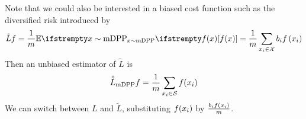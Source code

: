Note that we could also be interested in a biased cost function such as the diversified risk introduced by \cite{zhang2017dppminibatch}
$$
\tilde L{\query} =\frac{1}{m}\EE{x \sim \textrm{mDPP}}{\query(x)}=\frac{1}{m}\sum_{x_i \in \mathcal X} b_{i} \query\left(x_{i}\right)
$$
Then an unbiased estimator of $\tilde L$ is
\begin{equation*}
	\hat{\tilde L}_{\textrm{mDPP}}{f} = \frac{1}{m}\sum_{x_i\in \mathcal S} f(x_i)
\end{equation*}
We can switch between $L$ and $\tilde L$, substituting $f(x_i)$ by $\frac{b_i f(x_i)}{m}$.




